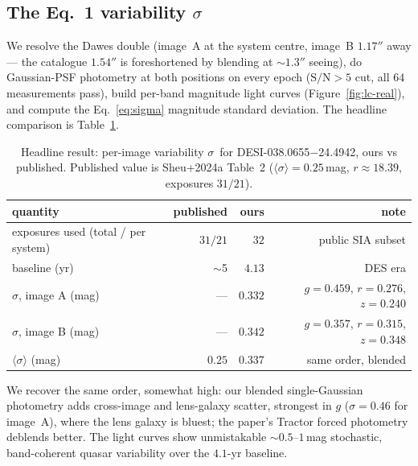 \documentclass[11pt,letterpaper]{article}
\newcommand{\sig}{\ensuremath{\sigma}}
\newcommand{\meansig}{\ensuremath{\langle\sigma\rangle}}
\newcommand{\target}{DESI-038.0655$-$24.4942}
\begin{document}
\subsection{The Eq.~1 variability \sig}

We resolve the Dawes double (image~A at the system centre, image~B $1.17''$
away --- the catalogue $1.54''$ is foreshortened by blending at $\sim$$1.3''$
seeing), do Gaussian-PSF photometry at both positions on every epoch
($\mathrm{S/N} > 5$ cut, all $64$ measurements pass), build per-band magnitude
light curves (Figure~\ref{fig:lc-real}), and compute the Eq.~\ref{eq:sigma}
magnitude standard deviation. The headline comparison is
Table~\ref{tab:headline}.

\begin{table}[ht]
\centering
\caption{Headline result: per-image variability \sig\ for \target, ours vs
published. Published value is Sheu+2024a Table~2 ($\meansig = 0.25$\,mag,
$r\approx 18.39$, exposures $31/21$).}
\label{tab:headline}
\begin{tabular}{lrrr}
\toprule
quantity                              & published & ours  & note \\
\midrule
exposures used (total / per system)   & $31/21$   & $32$  & public SIA subset \\
baseline (yr)                         & $\sim$5   & $4.13$ & DES era \\
\sig, image A (mag)                   & ---       & $0.332$ & $g{=}0.459$, $r{=}0.276$, $z{=}0.240$ \\
\sig, image B (mag)                   & ---       & $0.342$ & $g{=}0.357$, $r{=}0.315$, $z{=}0.348$ \\
$\meansig$ (mag)                      & $0.25$    & $\mathbf{0.337}$ & same order, blended \\
\bottomrule
\end{tabular}
\end{table}

We recover the same order, somewhat high: our blended single-Gaussian
photometry adds cross-image and lens-galaxy scatter, strongest in $g$
($\sigma = 0.46$ for image~A), where the lens galaxy is bluest; the paper's
Tractor forced photometry deblends better. The light curves show unmistakable
$\sim$$0.5$--$1$\,mag stochastic, band-coherent quasar variability over the
$4.1$-yr baseline.
\end{document}
